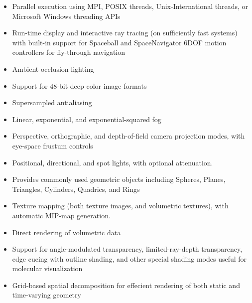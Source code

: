 \begin{itemize}
\item Parallel execution using MPI, POSIX threads, Unix-International threads,
      or Microsoft Windows threading APIs
\item Run-time display and interactive ray tracing
      (on sufficiently fast systems) with built-in support
      for Spaceball and SpaceNavigator 6DOF motion controllers for
      fly-through navigation
\item Ambient occlusion lighting
\item Support for 48-bit deep color image formats
\item Supersampled antialiasing
\item Linear, exponential, and exponential-squared fog
\item Perspective, orthographic, and depth-of-field camera projection
      modes, with eye-space frustum controls
\item Positional, directional, and spot lights, with optional attenuation.
\item Provides commonly used geometric objects including 
      Spheres, Planes, Triangles, Cylinders, Quadrics, and Rings
\item Texture mapping (both texture images, and volumetric textures), 
      with automatic MIP-map generation.
\item Direct rendering of volumetric data
\item Support for angle-modulated transparency, 
      limited-ray-depth transparency, edge cueing with outline shading,
      and other special shading modes useful for molecular visualization
\item Grid-based spatial decomposition for effecient rendering of both
      static and time-varying geometry
\end{itemize}


